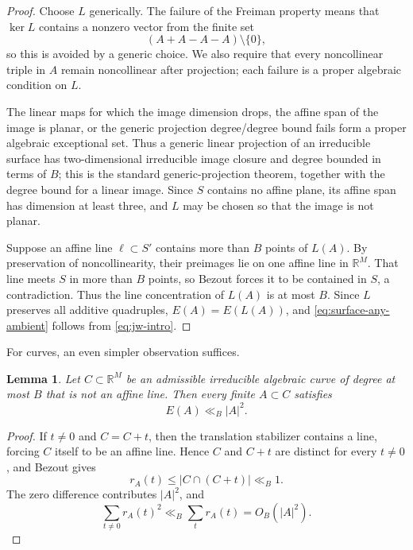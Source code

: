 \documentclass[11pt]{amsart}
\numberwithin{equation}{section}
\newtheorem{lemma}[theorem]{Lemma}
\theoremstyle{definition}
\theoremstyle{remark}
\newcommand{\R}{\mathbb R}
\newcommand{\1}{\mathbf 1}
\newcommand{\card}[1]{\lvert #1\rvert}
\begin{document}
\begin{proof}
Choose $L$ generically.  The failure of the Freiman property means that $\ker L$ contains a nonzero vector from the finite set
\[
 (A+A-A-A)\setminus\{0\},
\]
so this is avoided by a generic choice.  We also require that every noncollinear triple in $A$ remain noncollinear after projection; each failure is a proper algebraic condition on $L$.

The linear maps for which the image dimension drops, the affine span of the image is planar, or the generic projection degree/degree bound fails form a proper algebraic exceptional set.  Thus a generic linear projection of an irreducible surface has two-dimensional irreducible image closure and degree bounded in terms of $B$; this is the standard generic-projection theorem, together with the degree bound for a linear image.  Since $S$ contains no affine plane, its affine span has dimension at least three, and $L$ may be chosen so that the image is not planar.

Suppose an affine line $\ell\subset S'$ contains more than $B$ points of $L(A)$.  By preservation of noncollinearity, their preimages lie on one affine line in $\R^M$.  That line meets $S$ in more than $B$ points, so Bezout forces it to be contained in $S$, a contradiction.  Thus the line concentration of $L(A)$ is at most $B$.  Since $L$ preserves all additive quadruples, $E(A)=E(L(A))$, and \eqref{eq:surface-any-ambient} follows from \eqref{eq:jw-intro}.
\end{proof}

For curves, an even simpler observation suffices.

\begin{lemma}\label{lem:curve-energy}
Let $C\subset\R^M$ be an admissible irreducible algebraic curve of degree at most $B$ that is not an affine line.  Then every finite $A\subset C$ satisfies
\begin{equation}\label{eq:curve-energy}
 E(A)\ll_B\card A^2.
\end{equation}
\end{lemma}

\begin{proof}
If $t\neq0$ and $C=C+t$, then the translation stabilizer contains a line, forcing $C$ itself to be an affine line.  Hence $C$ and $C+t$ are distinct for every $t\neq0$, and Bezout gives
\[
 r_A(t)\leq\card{C\cap(C+t)}\ll_B1.
\]
The zero difference contributes $\card A^2$, and
\[
 \sum_{t\neq0}r_A(t)^2\ll_B\sum_t r_A(t)=O_B(\card A^2).
\]
\end{proof}
\end{document}
